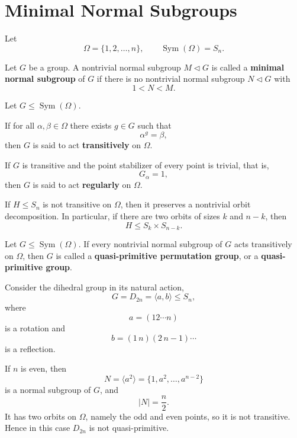 \section{Minimal Normal Subgroups}

Let
\[
\Omega=\{1,2,\dots,n\},\qquad \operatorname{Sym}(\Omega)=S_n.
\]

\begin{definition}
Let \(G\) be a group. A nontrivial normal subgroup \(M\lhd G\) is called a \textbf{minimal normal subgroup} of \(G\) if there is no nontrivial normal subgroup \(N\lhd G\) with
\[
1<N<M.
\]
\end{definition}

\begin{definition}
Let \(G\leq \operatorname{Sym}(\Omega)\).

If for all \(\alpha,\beta\in\Omega\) there exists \(g\in G\) such that
\[
\alpha^g=\beta,
\]
then \(G\) is said to act \textbf{transitively} on \(\Omega\).

If \(G\) is transitive and the point stabilizer of every point is trivial, that is,
\[
G_\alpha=1,
\]
then \(G\) is said to act \textbf{regularly} on \(\Omega\).
\end{definition}

\begin{remark}
If \(H\leq S_n\) is not transitive on \(\Omega\), then it preserves a nontrivial orbit decomposition. In particular, if there are two orbits of sizes \(k\) and \(n-k\), then
\[
H\leq S_k\times S_{n-k}.
\]
\end{remark}

\begin{definition}
Let \(G\leq \operatorname{Sym}(\Omega)\). If every nontrivial normal subgroup of \(G\) acts transitively on \(\Omega\), then \(G\) is called a \textbf{quasi-primitive permutation group}, or a \textbf{quasi-primitive group}.
\end{definition}

\begin{example}[A counterexample]
Consider the dihedral group in its natural action,
\[
G=D_{2n}=\langle a,b\rangle\leq S_n,
\]
where
\[
a=(12\cdots n)
\]
is a rotation and
\[
b=(1\,n)(2\,n-1)\cdots
\]
is a reflection.

If \(n\) is even, then
\[
N=\langle a^2\rangle=\{1,a^2,\dots,a^{n-2}\}
\]
is a normal subgroup of \(G\), and
\[
|N|=\frac n2.
\]
It has two orbits on \(\Omega\), namely the odd and even points, so it is not transitive. Hence in this case \(D_{2n}\) is not quasi-primitive.
\end{example}

